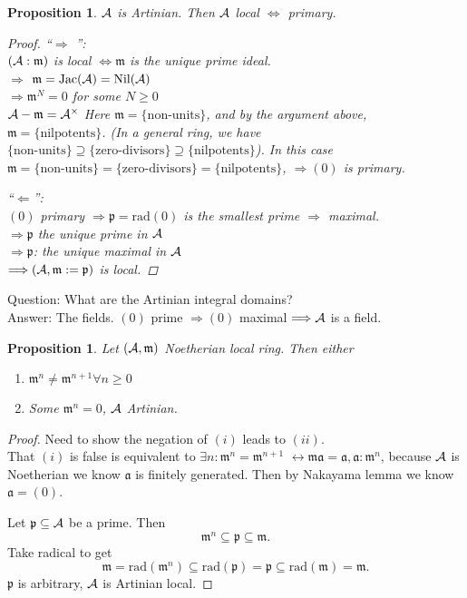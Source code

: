 \documentclass[11pt]{article}
\newtheorem{prop}[thm]{Proposition}
\newcommand{\sca}{{\mathfrak a}}
\newcommand{\scm}{{\mathfrak m}}
\newcommand{\scp}{{\mathfrak p}}
\newcommand{\cala}{{\cal A}}
\newcommand{\Lrta}{\Longrightarrow}
\newcommand{\llrta}{\longleftrightarrow}
\newcommand{\Llta}{\Longleftarrow}
\newcommand{\Llrta}{\Longleftrightarrow}
\begin{document}
\begin{prop}\label{prop:artin_local=artin_primary}
$\cala$ is Artinian.  Then $\cala$ local $\Llrta $ primary.
\begin{proof}
``$\Lrta$ '':\\
$(\cala:\scm)$ is local $\Llrta \scm $ is the unique prime ideal.\\
$\Lrta$ $\scm=\text{Jac}(\cala)=\text{Nil}(  \cala)$\\
$\Lrta\scm^N=0$ for some $N\geq 0$\\
$\cala-\scm=\cala^\times$
Here $\scm=\{\text{non-units}\}$, and by the argument above, $\scm=\{\text{nilpotents}\}$. (In a general ring, we have $\{\text{non-units}\}\supseteq\{\text{zero-divisors}\}\supseteq\{\text{nilpotents}\}$). In this case $\scm=\{\text{non-units}\}=\{\text{zero-divisors}\}=\{\text{nilpotents}\}$, $\Lrta(0)$ is primary.

``$\Llta$'':\\
 $(0)$ primary $\Lrta \scp=\text{rad}(0)$ is the smallest prime $\Lrta$ maximal.\\
$\Lrta\scp$ the unique prime in $\cala$\\
$\Lrta\scp$: the unique maximal in $\cala$\\
$\Lrta(\cala,\scm:=\scp)$ is local.

\end{proof}
\end{prop}

Question: What are the Artinian   integral domains?\\
Answer: The fields. $(0)$ prime $\Lrta (0)$ maximal $\Lrta \cala$ is a field. 

\begin{prop}\label{prop:Noetherian_local_Artinian_nilpotent}
Let $(\cala,\scm)$ Noetherian local ring. Then either 
\begin{enumerate}[label=(\roman*)]
\item $\scm^n\neq \scm^{n+1}\forall n\geq 0$
\item Some $\scm^n=0$, $\cala$ Artinian. 
\end{enumerate}
\end{prop}
\begin{proof}
Need to show the negation of $(i)$ leads to $(ii)$.\\
That $(i)$ is false is equivalent to $\exists n:\scm^n=\scm^{n+1}$ $\llrta \scm\sca=\sca,\sca:\scm^n$, because $\cala$ is Noetherian we know $\sca$ is finitely generated. Then by Nakayama lemma we know $\sca=(0)$.

Let $\scp\subseteq \cala$ be a prime. Then $$\scm^n\subseteq \scp\subseteq \scm.$$ 
Take radical to get
$$
\scm=\text{rad}(\scm^n)\subseteq\text{rad}(\scp)=\scp\subseteq \text{rad}(\scm)=\scm.
$$
$\scp$ is arbitrary, $\cala$ is Artinian   local.
\end{proof}
\end{document}
